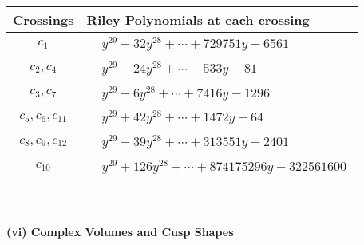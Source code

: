 \documentclass[1p]{elsarticle_modified}
\theoremstyle{definition}
\begin{document}
\begin{tabular}{m{50pt}|m{274pt}}
Crossings & \hspace{64pt}Riley Polynomials at each crossing \\
\hline $$\begin{aligned}c_{1}\end{aligned}$$&$\begin{aligned}
&y^{29}-32 y^{28}+\cdots+729751 y-6561
\end{aligned}$\\
\hline $$\begin{aligned}c_{2},c_{4}\end{aligned}$$&$\begin{aligned}
&y^{29}-24 y^{28}+\cdots-533 y-81
\end{aligned}$\\
\hline $$\begin{aligned}c_{3},c_{7}\end{aligned}$$&$\begin{aligned}
&y^{29}-6 y^{28}+\cdots+7416 y-1296
\end{aligned}$\\
\hline $$\begin{aligned}c_{5},c_{6},c_{11}\end{aligned}$$&$\begin{aligned}
&y^{29}+42 y^{28}+\cdots+1472 y-64
\end{aligned}$\\
\hline $$\begin{aligned}c_{8},c_{9},c_{12}\end{aligned}$$&$\begin{aligned}
&y^{29}-39 y^{28}+\cdots+313551 y-2401
\end{aligned}$\\
\hline $$\begin{aligned}c_{10}\end{aligned}$$&$\begin{aligned}
&y^{29}+126 y^{28}+\cdots+874175296 y-322561600
\end{aligned}$\\
\hline
\end{tabular}\\~\\
\newpage\flushleft \textbf{(vi) Complex Volumes and Cusp Shapes}
\end{document}
